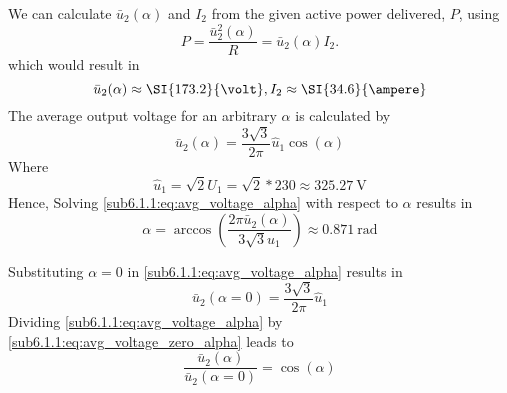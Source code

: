     \begin{solutionblock}
        We can calculate $\bar{u}_\mathrm{2}(\alpha)$ and $I_\mathrm{2}$ from the given active power delivered, $P$, using
        \begin{equation} 
            P = \frac{\bar{u}^2_\mathrm{2}(\alpha)}{R} = \bar{u}_\mathrm{2}(\alpha) I_\mathrm{2}.
            \label{sub6.1.1:eq:Active_power_formula}
        \end{equation}
    which would result in 
        \begin{equation}
            \bar{u}_\mathrm{2}(\alpha) \approx \SI{173.2}{\volt},\\
            I_\mathrm{2} \approx \SI{34.6}{\ampere}
        \end{equation}
        The average output voltage for an arbitrary $\alpha$ is calculated by
        \begin{equation}
            \bar{u}_\mathrm{2}(\alpha) = \frac{3\sqrt{3}}{2\pi}\hat{u}_\mathrm{1}\cos(\alpha)
            \label{sub6.1.1:eq:avg_voltage_alpha}
        \end{equation}
        Where
        \begin{equation}
            \hat{u}_\mathrm{1} = \sqrt{2}U_\mathrm{1} = \sqrt{2} * 230 \approx \SI{325.27}{\volt}
            \label{sub6.1.1:eq:voltage_amplitude}
    \end{equation}
    Hence, 
    Solving \eqref{sub6.1.1:eq:avg_voltage_alpha} with respect to $\alpha$ results in
        \begin{equation}
            \alpha = \arccos\left(\frac{ 2\pi\bar{u}_\mathrm{2}(\alpha)}{3\sqrt{3}\hat{u}_\mathrm{1}}\right) \approx \SI{0.871}{\radian}
            \label{sub6.1.1:eq:calculate_alpha}
        \end{equation}    
    
    \end{solutionblock}
    \begin{solutionblock}
        Substituting $\alpha = 0$ in \eqref{sub6.1.1:eq:avg_voltage_alpha} results in
        \begin{equation}
            \bar{u}_\mathrm{2}(\alpha=0) = \frac{3\sqrt{3}}{2\pi}\hat{u}_\mathrm{1}
            \label{sub6.1.1:eq:avg_voltage_zero_alpha}
        \end{equation}
        Dividing \eqref{sub6.1.1:eq:avg_voltage_alpha} by \eqref{sub6.1.1:eq:avg_voltage_zero_alpha} leads to  
        \begin{equation}
            \frac{ \bar{u}_\mathrm{2}(\alpha)}{\bar{u}_\mathrm{2}(\alpha=0)} = \cos(\alpha)
            \label{sub6.1.1:eq:voltages_relation}
        \end{equation}    
        
    \end{solutionblock}
